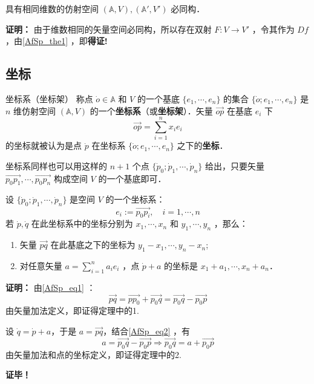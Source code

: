 \begin{corollary}{}
具有相同维数的仿射空间 $(\mathbb A,V),(\mathbb A',V')$ 必同构．
\end{corollary}
\textbf{证明：} 由于维数相同的矢量空间必同构，所以存在双射 $F:V\rightarrow V'$ ，令其作为 $Df$ ，由\autoref{AfSp_the1} ，即\textbf{得证!}
\subsection{坐标}
\begin{definition}{坐标系（坐标架）}
称点 $\dot o\in\mathbb A$ 和 $V$ 的一个基底 $\{e_1,\cdots,e_n\}$ 的集合 $\{\dot o;e_1,\cdots,e_n\}$ 是 $n$ 维仿射空间 $(\mathbb A,V)$ 的一个\textbf{坐标系}（或\textbf{坐标架}）．矢量 $\vec{op}$ 在基底 ${e_i}$ 下
\begin{equation}
\vec{op}=\sum_{i=1}^n x_ie_i
\end{equation}
的坐标就被认为是点 $\dot p$ 在坐标系 $\{\dot o;e_1,\cdots,e_n\}$ 之下的\textbf{坐标}．
\end{definition}
坐标系同样也可以用这样的 $n+1$ 个点 $\{\dot p_0;\dot p_1,\cdots,\dot p_n\}$ 给出，只要矢量 $\vec{p_0p_1},\cdots,\vec{p_0p_n}$ 构成空间 $V$ 的一个基底即可．
\begin{theorem}{}
设 $\{\dot p_0;\dot p_1,\cdots,\dot p_n\}$ 是空间 $V$ 的一个坐标系：
\begin{equation}
e_i:=\vec{p_0 p_i},\quad i=1,\cdots,n
\end{equation}
若 $\dot p,\dot q$ 在此坐标系中的坐标分别为 $x_1,\cdots,x_n$ 和 $y_1,\cdots,y_n$ ，那么：
\begin{enumerate}
\item 矢量 $\vec{pq}$ 在此基底之下的坐标为 $y_1-x_1,\cdots,y_n-x_n$;
\item 对任意矢量 $a=\sum\limits_{i=1}^n a_ie_i$ ，点 $\dot p+a$ 的坐标是 $x_1+a_1,\cdots,x_n+a_n$．
\end{enumerate}
\end{theorem} 
\textbf{证明：} 由\autoref{AfSp_eq1} ：
\begin{equation}\label{AfSp_eq2}
\vec{pq}=\vec{pp_0}+\vec{p_0q}=\vec{p_0q}-\vec{p_0p}
\end{equation}
由矢量加法定义，即证得定理中的1.

设 $\dot q=\dot p+a$，于是 $a=\vec{pq}$，结合\autoref{AfSp_eq2} ，有
\begin{equation}
a=\vec{p_0q}-\vec{p_0p}\Rightarrow \vec{p_0q}=a+\vec{p_0p}
\end{equation}
由矢量加法和点的坐标定义，即证得定理中的2.

\textbf{证毕！}